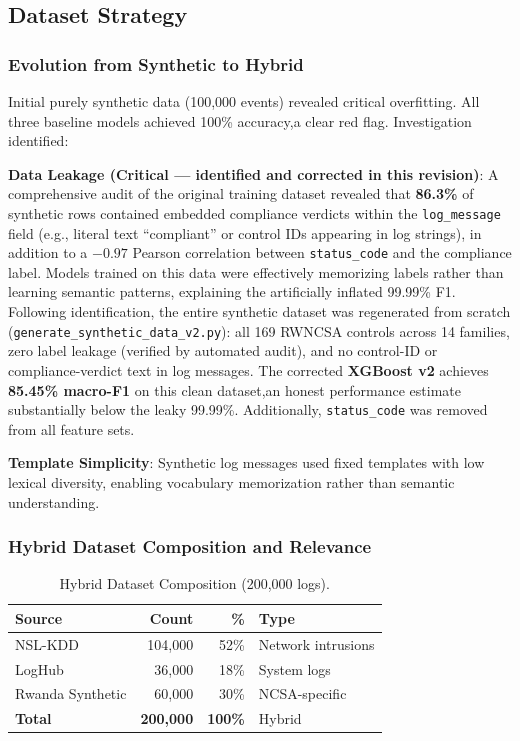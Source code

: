 \documentclass[futureinternet,article,submit,pdftex,moreauthors]{Definitions/mdpi}
\begin{document}
\subsection{Dataset Strategy}

\subsubsection{Evolution from Synthetic to Hybrid}

Initial purely synthetic data (100{,}000 events) revealed critical overfitting. All three
baseline models achieved 100\% accuracy,a clear red flag. Investigation identified:

\textbf{Data Leakage (Critical --- identified and corrected in this revision)}:
A comprehensive audit of the original training dataset revealed that \textbf{86.3\%} of synthetic
rows contained embedded compliance verdicts within the \texttt{log\_message} field (e.g., literal
text ``compliant'' or control IDs appearing in log strings), in addition to a
$-0.97$ Pearson correlation between \texttt{status\_code} and the compliance label.
Models trained on this data were effectively memorizing labels rather than learning semantic
patterns, explaining the artificially inflated 99.99\% F1.
Following identification, the entire synthetic dataset was regenerated from scratch
(\texttt{generate\_synthetic\_data\_v2.py}): all 169 RWNCSA controls across 14 families,
zero label leakage (verified by automated audit), and no control-ID or compliance-verdict
text in log messages. The corrected \textbf{XGBoost v2} achieves \textbf{85.45\% macro-F1}
on this clean dataset,an honest performance estimate substantially below the leaky 99.99\%.
Additionally, \texttt{status\_code} was removed from all feature sets.

\textbf{Template Simplicity}: Synthetic log messages used fixed templates with low lexical
diversity, enabling vocabulary memorization rather than semantic understanding.

\subsubsection{Hybrid Dataset Composition and Relevance}

\begin{table}[H]
\caption{Hybrid Dataset Composition (200{,}000 logs).\label{tab:dataset}}
\begin{tabularx}{\textwidth}{lrrX}
\toprule
\textbf{Source} & \textbf{Count} & \textbf{\%} & \textbf{Type} \\
\midrule
NSL-KDD~\cite{nslkdd} & 104{,}000 & 52\% & Network intrusions \\
LogHub~\cite{loghub} & 36{,}000 & 18\% & System logs \\
Rwanda Synthetic & 60{,}000 & 30\% & NCSA-specific \\
\midrule
\textbf{Total} & \textbf{200{,}000} & \textbf{100\%} & Hybrid \\
\bottomrule
\end{tabularx}
\end{table}
\end{document}
